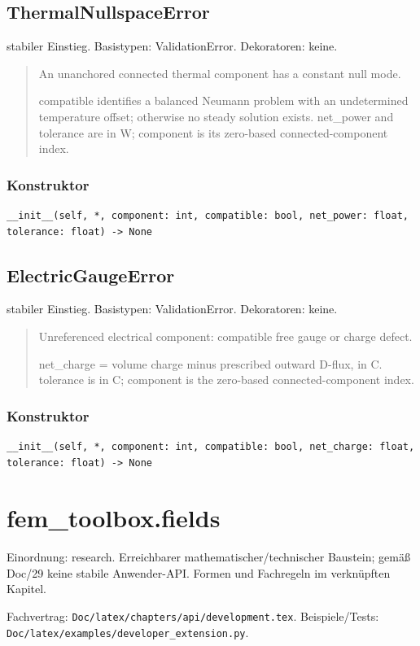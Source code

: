 \subsection{ThermalNullspaceError}
stabiler Einstieg.
Basistypen: ValidationError. Dekoratoren: keine.
\begin{quote}
An unanchored connected thermal component has a constant null mode.\par compatible identifies a balanced Neumann problem with an undetermined temperature offset; otherwise no steady solution exists. net\_power and tolerance are in W; component is its zero-based connected-component index.
\end{quote}
\subsubsection*{Konstruktor}
\begin{lstlisting}
__init__(self, *, component: int, compatible: bool, net_power: float, tolerance: float) -> None
\end{lstlisting}
\subsection{ElectricGaugeError}
stabiler Einstieg.
Basistypen: ValidationError. Dekoratoren: keine.
\begin{quote}
Unreferenced electrical component: compatible free gauge or charge defect.\par net\_charge = volume charge minus prescribed outward D-flux, in C. tolerance is in C; component is the zero-based connected-component index.
\end{quote}
\subsubsection*{Konstruktor}
\begin{lstlisting}
__init__(self, *, component: int, compatible: bool, net_charge: float, tolerance: float) -> None
\end{lstlisting}
\section{fem\_toolbox.fields}
Einordnung: research. Erreichbarer mathematischer/technischer Baustein; gemäß Doc/29 keine stabile Anwender-API. Formen und Fachregeln im verknüpften Kapitel.
\par Fachvertrag: \nolinkurl{Doc/latex/chapters/api/development.tex}. Beispiele/Tests:
\nolinkurl{Doc/latex/examples/developer_extension.py}.
